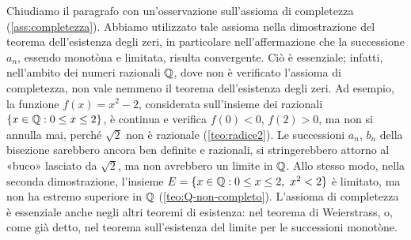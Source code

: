 Chiudiamo il paragrafo con un'osservazione sull'assioma di completezza
(\cref{ass:completezza}). Abbiamo utilizzato tale assioma nella dimostrazione del teorema
dell'esistenza degli zeri, in particolare nell'affermazione che la successione $a_{n}$,
essendo monotòna e limitata, risulta convergente. Ciò è essenziale; infatti,
nell'ambito dei numeri razionali $\mathbb{Q}$, dove non è verificato l'assioma di completezza,
non vale nemmeno il teorema dell'esistenza degli zeri. Ad esempio, la funzione
$f(x)=x^{2}-2$, considerata sull'insieme dei razionali $\{x\in\mathbb{Q} : 0\le x\le2\}$, è
continua e verifica $f(0)<0$, $f(2)>0$, ma non si annulla mai, perché $\sqrt2$ non è
razionale (\cref{teo:radice2}). Le successioni $a_{n}$, $b_{n}$ della bisezione sarebbero
ancora ben definite e razionali, si stringerebbero attorno al «buco» lasciato da
$\sqrt2$, ma non avrebbero un limite in $\mathbb{Q}$. Allo stesso modo, nella seconda
dimostrazione, l'insieme $E=\{x\in\mathbb{Q} : 0\le x\le2,\ x^{2}<2\}$ è limitato, ma non ha
estremo superiore in $\mathbb{Q}$ (\cref{teo:Q-non-completo}). L'assioma di completezza è essenziale anche
negli altri teoremi di esistenza: nel teorema di Weierstrass, o, come già detto, nel
teorema sull'esistenza del limite per le successioni monotòne.
